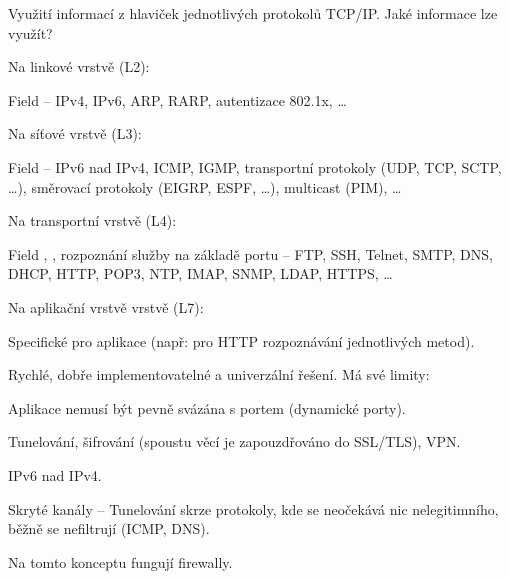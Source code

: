 \begin{compactitem}
    \item Využití informací z hlaviček jednotlivých protokolů TCP/IP. Jaké informace lze využít? \begin{compactitem}
        \item Na linkové vrstvě (L2): \begin{compactitem}
            \item Field  -- IPv4, IPv6, ARP, RARP, autentizace 802.1x, \dots
        \end{compactitem}
        \item Na síťové vrstvě (L3): \begin{compactitem}
            \item Field  -- IPv6 nad IPv4, ICMP, IGMP, transportní protokoly (UDP, TCP, SCTP, \dots), směrovací protokoly (EIGRP, ESPF, \dots), multicast (PIM), \dots
        \end{compactitem}
        \item  Na transportní vrstvě (L4): \begin{compactitem}
            \item Field , , rozpoznání služby na základě portu -- FTP, SSH, Telnet, SMTP, DNS, DHCP, HTTP, POP3, NTP, IMAP, SNMP, LDAP, HTTPS, \dots
        \end{compactitem}
        \item  Na aplikační vrstvě vrstvě (L7): \begin{compactitem}
            \item Specifické pro aplikace (např: pro HTTP rozpoznávání jednotlivých metod).
        \end{compactitem}
    \end{compactitem}
    \item Rychlé, dobře implementovatelné a univerzální řešení. Má své limity: \begin{compactitem}
        \item Aplikace nemusí být pevně svázána s portem (dynamické porty).
        \item Tunelování, šifrování (spoustu věcí je zapouzdřováno do SSL/TLS), VPN.
        \item IPv6 nad IPv4.
        \item Skryté kanály -- Tunelování skrze protokoly, kde se neočekává nic nelegitimního, běžně se nefiltrují (ICMP, DNS).
    \end{compactitem}
    \item Na tomto konceptu fungují firewally.
\end{compactitem}

